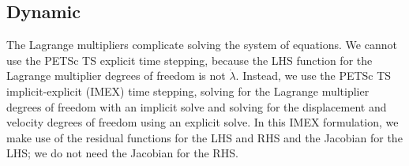 \subsection{Dynamic}

The Lagrange multipliers complicate solving the system of
equations. We cannot use the PETSc TS explicit time stepping, because
the LHS function for the Lagrange multiplier degrees of freedom is not
$\dot{\lambda}$. Instead, we use the PETSc TS implicit-explicit (IMEX)
time stepping, solving for the Lagrange multiplier degrees of freedom
with an implicit solve and solving for the displacement and velocity
degrees of freedom using an explicit solve. In this IMEX formulation, we make use
of the residual functions for the LHS and RHS and the Jacobian for the
LHS; we do not need the Jacobian for the RHS.

